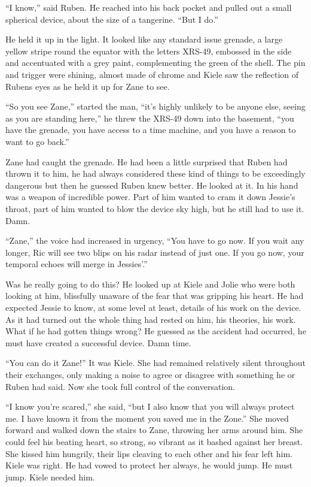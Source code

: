 ``I know,'' said Ruben.  He reached into his back pocket and pulled out a small spherical device, about the size of a tangerine.  ``But I do.''

He held it up in the light.  It looked like any standard issue grenade, a large yellow stripe round the equator with the letters XRS-49, embossed in the side and accentuated with a grey paint, complementing the green of the shell.  The pin and trigger were shining, almost made of chrome and Kiele saw the reflection of Rubens eyes as he held it up for Zane to see.

``So you see Zane,'' started the man, ``it's highly unlikely to be anyone else, seeing as you are standing here,'' he threw the XRS-49 down into the basement, ``you have the grenade, you have access to a time machine, and you have a reason to want to go back.''

Zane had caught the grenade.  He had been a little surprised that Ruben had thrown it to him, he had always considered these kind of things to be exceedingly dangerous but then he guessed Ruben knew better.  He looked at it.  In his hand was a weapon of incredible power.  Part of him wanted to cram it down Jessie's throat, part of him wanted to blow the device sky high, but he still had to use it.  Damn. 

``Zane,'' the voice had increased in urgency, ``You have to go now.  If you wait any longer, Ric will see two blips on his radar instead of just one.  If you go now, your temporal echoes will merge in Jessies'.''

Was he really going to do this?  He looked up at Kiele and Jolie who were both looking at him, blissfully unaware of the fear that was gripping his heart.  He had expected Jessie to know, at some level at least, details of his work on the device.  As it had turned out the whole thing had rested on him, his theories, his work.  What if he had gotten things wrong?  He guessed as the accident had occurred, he must have created a successful device.  Damn time.

``You can do it Zane!''  It was Kiele.  She had remained relatively silent throughout their exchanges, only making a noise to agree or disagree with something he or Ruben had said.  Now she took full control of the conversation.

``I know you're scared,'' she said, ``but I also know that you will always protect me.  I have known it from the moment you saved me in the Zone.''  She moved forward and walked down the stairs to Zane, throwing her arms around him.  She could feel his beating heart, so strong, so vibrant as it bashed against her breast.  She kissed him hungrily, their lips cleaving to each other and his fear left him.  Kiele was right.  He had vowed to protect her always, he would jump.  He must jump.  Kiele needed him.

